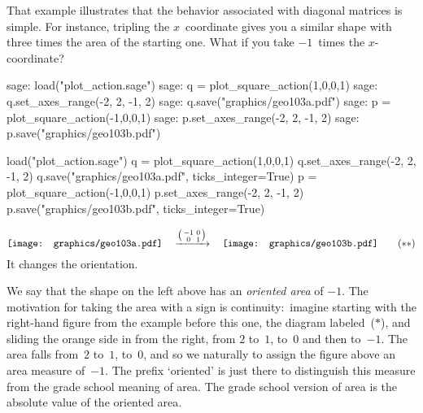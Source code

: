 That example illustrates that the behavior associated with diagonal matrices
is simple.
For instance, tripling the $x$~coordinate gives you a similar shape with
three times the area of the starting one.
What if you take $-1$~times the $x$-coordinate?
\begin{sagecommandline}
sage: load("plot_action.sage")
sage: q = plot_square_action(1,0,0,1) 
sage: q.set_axes_range(-2, 2, -1, 2) 
sage: q.save("graphics/geo103a.pdf")
sage: p = plot_square_action(-1,0,0,1) 
sage: p.set_axes_range(-2, 2, -1, 2) 
sage: p.save("graphics/geo103b.pdf")
\end{sagecommandline}
\begin{sagesilent}
load("plot_action.sage")
q = plot_square_action(1,0,0,1) 
q.set_axes_range(-2, 2, -1, 2) 
q.save("graphics/geo103a.pdf", ticks_integer=True)
p = plot_square_action(-1,0,0,1) 
p.set_axes_range(-2, 2, -1, 2) 
p.save("graphics/geo103b.pdf", ticks_integer=True)
\end{sagesilent}
\begin{equation*}
  \vcenteredhbox{\texttt{[image: graphics/geo103a.pdf]}}
  \quad\mapsvia{\big (\begin{smallmatrix} -1 &0 \\ 0 &1 \end{smallmatrix}\big )}\quad
  \vcenteredhbox{\texttt{[image: graphics/geo103b.pdf]}}
  \tag{$**$}
\end{equation*}
It changes the orientation.

We say that the shape on the left above has an \textit{oriented area}
of $-1$.
The motivation for taking the area with a sign 
is continuity:~imagine starting with the right-hand figure 
from the example before this one, the diagram labeled~($*$),
and sliding the orange side in from the right, from $2$ to~$1$, to~$0$ and
then to~$-1$.
The area falls from~$2$ to~$1$, to~$0$, and so we naturally
to assign the figure above an area measure of~$-1$.
The prefix `oriented' is just there to distinguish this measure from the
grade school meaning of area.
The grade school version of area is the absolute value of the oriented area.

